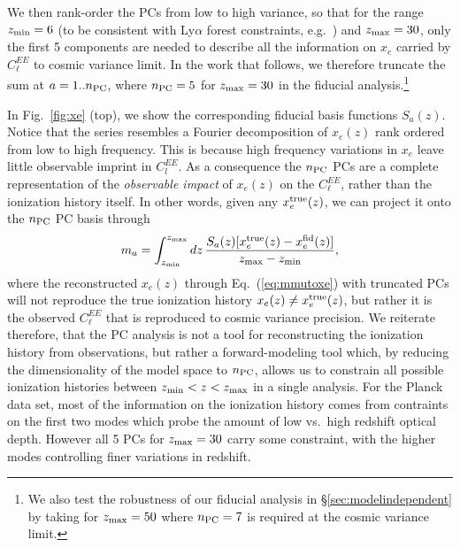 \documentclass[prd,twocolumn,amsmath,amssymb,floatfix,superscriptaddress,nofootinbib]{revtex4-1}
\newcommand{\xef}{x_e^{\rm fid}}
\newcommand{\zmax}{z_{\rm max}}
\newcommand{\zmin}{z_{\rm min}}
\begin{document}
We then rank-order the PCs from low to high variance, so that for the range $z_{\rm min} = 6$ (to be consistent with Ly$\alpha$ forest constraints, e.g.~\cite{Becker:2015lua}) and $z_{\rm max} = 30$, only the first 5 components are needed to describe all the information on $x_e$ carried by $C_\ell^{EE}$ to cosmic variance limit. In the work that follows, we therefore truncate the sum at $a = 1 .. n_{\rm{PC}}$, where $n_{\rm{PC}} = 5$ for $z_{\rm max} = 30$ in the fiducial analysis.\footnote{We also test the robustness of our fiducial analysis in \S \ref{sec:modelindependent} by  taking 
 for $z_{\rm max} = 50$ where $n_{\rm{PC}} = 7$ is required at the cosmic variance limit.}   
 
 
 
 
 In Fig.~\ref{fig:xe}
 (top), we show the corresponding fiducial basis functions $S_a(z)$.  
Notice that the series resembles a Fourier decomposition of $x_e(z)$ rank ordered from low to high frequency.
This is because high frequency variations in $x_e$ leave little observable imprint in $C_l^{EE}$.  
As a consequence  the $n_{\rm PC}$ PCs are a complete representation of the \textit{observable impact} of $x_e(z)$ on the $C_\ell^{EE}$, rather than the ionization history itself. In other words, 
given any $x_e^{\rm true}(z)$, we can project it onto the $n_{\rm PC}$ PC basis through
\begin{equation}
m_{a}=
  \int _{\zmin}^{\zmax} dz\, \frac{S_{a}(z) [x_e^{\rm true}(z)-\xef(z)]}{\zmax-\zmin},
\label{eq:xetommu}
\end{equation}
%
where the reconstructed $x_e(z)$ through Eq.~(\ref{eq:mmutoxe}) with truncated PCs will not reproduce the true ionization history $x_e(z) \neq x_e^{\rm true}(z)$, but rather it is the observed $C_\ell^{EE}$ that is reproduced to cosmic variance precision. We reiterate therefore, that the PC analysis is not a tool for reconstructing the ionization history from observations, but rather a forward-modeling tool which, by reducing the dimensionality of the model space to $n_{\rm PC}$, allows us to constrain all possible ionization histories between $z_{\rm min}<z<z_{\rm max}$ in a single analysis.
For the Planck data set, most of the information on the ionization history comes from contraints on the first two modes which probe the amount of low vs.\ high redshift optical depth.   However all 5 PCs for $z_{\rm max}=30$ carry some constraint, with the higher modes controlling finer variations in redshift.
\end{document}
